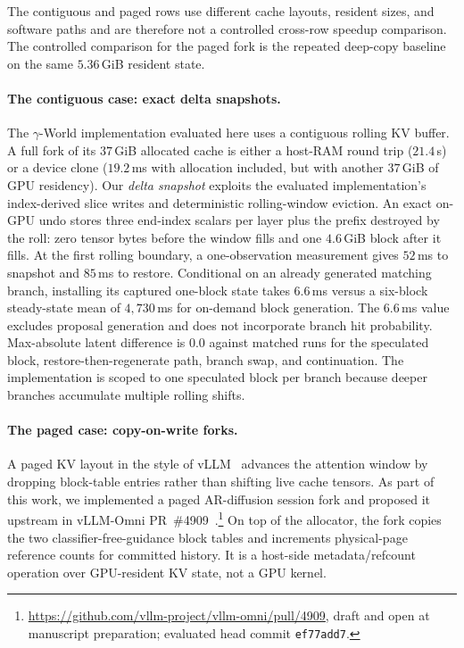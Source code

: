 \documentclass[11pt]{article}
\begin{document}
The contiguous and paged rows use different cache layouts, resident sizes, and software paths and are therefore not a controlled cross-row speedup comparison. The controlled comparison for the paged fork is the repeated deep-copy baseline on the same $5.36$\,GiB resident state.

\paragraph{The contiguous case: exact delta snapshots.}
The $\gamma$-World implementation evaluated here uses a contiguous rolling KV buffer. A full fork of its $37$\,GiB allocated cache is either a host-RAM round trip ($21.4$\,s) or a device clone ($19.2$\,ms with allocation included, but with another $37$\,GiB of GPU residency). Our \emph{delta snapshot} exploits the evaluated implementation's index-derived slice writes and deterministic rolling-window eviction. An exact on-GPU undo stores three end-index scalars per layer plus the prefix destroyed by the roll: zero tensor bytes before the window fills and one $4.6$\,GiB block after it fills. At the first rolling boundary, a one-observation measurement gives $52$\,ms to snapshot and $85$\,ms to restore. Conditional on an already generated matching branch, installing its captured one-block state takes $6.6$\,ms versus a six-block steady-state mean of $4{,}730$\,ms for on-demand block generation. The $6.6$\,ms value excludes proposal generation and does not incorporate branch hit probability. Max-absolute latent difference is $0.0$ against matched runs for the speculated block, restore-then-regenerate path, branch swap, and continuation. The implementation is scoped to one speculated block per branch because deeper branches accumulate multiple rolling shifts.

\paragraph{The paged case: copy-on-write forks.}
A paged KV layout in the style of vLLM~\cite{pagedattention} advances the attention window by dropping block-table entries rather than shifting live cache tensors. As part of this work, we implemented a paged AR-diffusion session fork and proposed it upstream in vLLM-Omni PR~\#4909~\cite{vllmomni}.\footnote{\url{https://github.com/vllm-project/vllm-omni/pull/4909}, draft and open at manuscript preparation; evaluated head commit \texttt{ef77add7}.} On top of the allocator, the fork copies the two classifier-free-guidance block tables and increments physical-page reference counts for committed history. It is a host-side metadata/refcount operation over GPU-resident KV state, not a GPU kernel.
\end{document}
